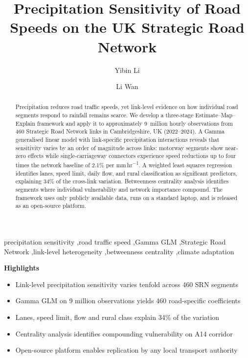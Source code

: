 \documentclass[review]{elsarticle}
\begin{document}
\begin{frontmatter}

\title{Precipitation Sensitivity of Road Speeds on the UK Strategic Road Network}

\author[cam]{Yibin Li}
\author[cam]{Li Wan}


\begin{abstract}
Precipitation reduces road traffic speeds, yet link-level evidence on how individual road segments respond to rainfall remains scarce. We develop a three-stage Estimate--Map--Explain framework and apply it to approximately 9~million hourly observations from 460 Strategic Road Network links in Cambridgeshire, UK (2022--2024). A Gamma generalised linear model with link-specific precipitation interactions reveals that sensitivity varies by an order of magnitude across links: motorway segments show near-zero effects while single-carriageway connectors experience speed reductions up to four times the network baseline of 2.1\% per mm\,hr\textsuperscript{$-$1}. A weighted least squares regression identifies lanes, speed limit, daily flow, and rural classification as significant predictors, explaining 34\% of the cross-link variation. Betweenness centrality analysis identifies segments where individual vulnerability and network importance compound. The framework uses only publicly available data, runs on a standard laptop, and is released as an open-source platform.
\end{abstract}

\begin{keyword}
precipitation sensitivity \sep road traffic speed \sep Gamma GLM \sep Strategic Road Network \sep link-level heterogeneity \sep betweenness centrality \sep climate adaptation
\end{keyword}

\end{frontmatter}

\noindent\textbf{Highlights}
\begin{itemize}
\item Link-level precipitation sensitivity varies tenfold across 460 SRN segments
\item Gamma GLM on 9 million observations yields 460 road-specific coefficients
\item Lanes, speed limit, flow and rural class explain 34\% of the variation
\item Centrality analysis identifies compounding vulnerability on A14 corridor
\item Open-source platform enables replication by any local transport authority
\end{itemize}
\end{document}
